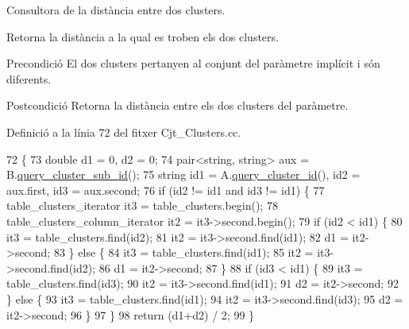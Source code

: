 Consultora de la distància entre dos clusters. 

Retorna la distància a la qual es troben els dos clusters.

\begin{DoxyPrecond}{Precondició}
El dos clusters pertanyen al conjunt del paràmetre implícit i són diferents. 
\end{DoxyPrecond}
\begin{DoxyPostcond}{Postcondició}
Retorna la distància entre els dos clusters del paràmetre. 
\end{DoxyPostcond}


Definició a la línia 72 del fitxer Cjt\+\_\+\+Clusters.\+cc.


\begin{DoxyCode}
72                                                           \{
73     \textcolor{keywordtype}{double} d1 = 0, d2 = 0;
74     pair<string, string> aux = B.\hyperlink{class_cluster_ae8c8a1d94203dccfd6fbbc5389a1e0ec}{query\_cluster\_sub\_id}();
75     \textcolor{keywordtype}{string} id1 = A.\hyperlink{class_cluster_a7e077596f7eb4f2bdf2847d65fa37654}{query\_cluster\_id}(), id2 = aux.first, id3 = aux.second;
76     \textcolor{keywordflow}{if} (id2 != id1 and id3 != id1) \{
77         table\_clusters\_iterator it3 = table\_clusters.begin();
78         table\_clusters\_column\_iterator it2 = it3->second.begin();
79         \textcolor{keywordflow}{if} (id2 < id1) \{
80             it3 = table\_clusters.find(id2);
81             it2 = it3->second.find(id1);
82             d1 = it2->second;
83         \} \textcolor{keywordflow}{else} \{
84             it3 = table\_clusters.find(id1);
85             it2 = it3->second.find(id2);
86             d1 = it2->second;
87         \}
88         \textcolor{keywordflow}{if} (id3 < id1) \{
89             it3 = table\_clusters.find(id3);
90             it2 = it3->second.find(id1);
91             d2 = it2->second;            
92         \} \textcolor{keywordflow}{else} \{
93             it3 = table\_clusters.find(id1);
94             it2 = it3->second.find(id3);
95             d2 = it2->second;                
96         \}   
97     \}   
98     \textcolor{keywordflow}{return} (d1+d2) / 2;    
99 \}
\end{DoxyCode}
\mbox{\label{class_cjt___clusters_ad794d3d1b0df7adb7fbb35d21634f5a0}} 
